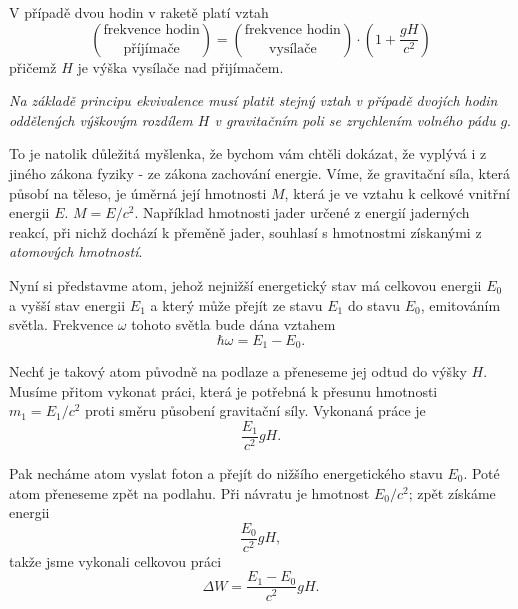     V případě dvou hodin v raketě platí vztah
    \begin{equation*}
      \binom{\text{frekvence hodin}}{\text{příjímače}} 
        = \binom{\text{frekvence hodin}}{\text{vysílače}}\cdot\left(1 + \dfrac{gH}{c^2}\right)
    \end{equation*}
    přičemž \(H\) je výška vysílače nad přijímačem. 
    
    \emph{Na základě principu ekvivalence musí platit stejný vztah v případě dvojích hodin 
    oddělených výškovým rozdílem \(H\) v gravitačním poli se zrychlením volného pádu} \(g\). 
    
    To je natolik důležitá myšlenka, že bychom vám chtěli dokázat, že vyplývá i z jiného zákona 
    fyziky - ze zákona zachování energie. Víme, že gravitační síla, která působí na těleso, je 
    úměrná její hmotnosti \(M\), která je ve vztahu k celkové vnitřní energii \(E\). \(M=E/c^2\). 
    Například hmotnosti jader určené z energií jaderných reakcí, při nichž dochází k přeměně jader, 
    souhlasí s hmotnostmi získanými z \emph{atomových hmotností}.
    
    Nyní si představme atom, jehož nejnižší energetický stav má celkovou energii \(E_0\) a vyšší 
    stav energii \(E_1\) a který může přejít ze stavu \(E_1\) do stavu \(E_0\), emitováním světla. 
    Frekvence \(\omega\) tohoto světla bude dána vztahem
    \begin{equation}\label{fyz:eq534}
      \hbar\omega = E_1 - E_0.
    \end{equation}
    
    Nechť je takový atom původně na podlaze a přeneseme jej odtud do výšky \(H\). Musíme přitom 
    vykonat práci, která je potřebná k přesunu hmotnosti \(m_1 = E_1/c^2\) proti směru působení 
    gravitační síly. Vykonaná práce je
    \begin{equation}\label{fyz:eq535}
      \dfrac{E_1}{c^2}gH.
    \end{equation}
    
    Pak necháme atom vyslat foton a přejít do nižšího energetického stavu \(E_0\). Poté atom 
    přeneseme zpět na podlahu. Při návratu je hmotnost \(E_0/c^2\); zpět získáme energii
    \begin{equation}\label{fyz:eq536}
      \dfrac{E_0}{c^2}gH,
    \end{equation}
    takže jsme vykonali celkovou práci
    \begin{equation}\label{fyz:eq537}
      \Delta W = \dfrac{E_1 - E_0}{c^2}gH.
    \end{equation}
    

